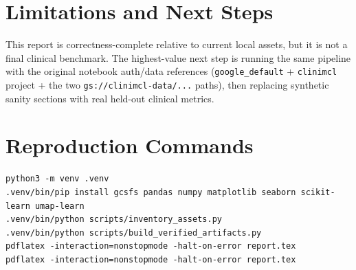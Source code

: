 \documentclass{article}
\begin{document}
\section{Limitations and Next Steps}
This report is correctness-complete relative to current local assets, but it is not a final clinical benchmark. The highest-value next step is running the same pipeline with the original notebook auth/data references (\texttt{google\_default} + \texttt{clinimcl} project + the two \texttt{gs://clinimcl-data/...} paths), then replacing synthetic sanity sections with real held-out clinical metrics.

\section{Reproduction Commands}
\begin{verbatim}
python3 -m venv .venv
.venv/bin/pip install gcsfs pandas numpy matplotlib seaborn scikit-learn umap-learn
.venv/bin/python scripts/inventory_assets.py
.venv/bin/python scripts/build_verified_artifacts.py
pdflatex -interaction=nonstopmode -halt-on-error report.tex
pdflatex -interaction=nonstopmode -halt-on-error report.tex
\end{verbatim}
\end{document}
